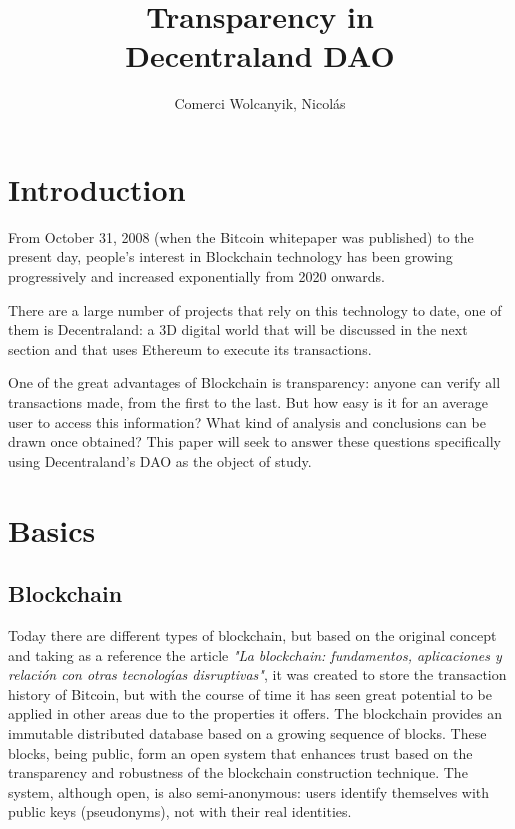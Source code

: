 \documentclass[MSE,Master,english]{twbook}%
\title{Transparency in\\Decentraland DAO}
\author{Comerci Wolcanyik, Nicol{\'a}s}
\begin{document}
\maketitle

%
%
\chapter{Introduction}
From October 31, 2008 (when the Bitcoin whitepaper was published) to the present day, people's interest in Blockchain technology has been growing progressively and increased exponentially from 2020 onwards. 

There are a large number of projects that rely on this technology to date, one of them is Decentraland: a 3D digital world that will be discussed in the next section and that uses Ethereum to execute its transactions.

One of the great advantages of Blockchain is transparency: anyone can verify all transactions made, from the first to the last. But how easy is it for an average user to access this information? What kind of analysis and conclusions can be drawn once obtained? This paper will seek to answer these questions specifically using Decentraland's DAO as the object of study. \\
\toComplete
\clearpage

\chapter{Basics}
\section{Blockchain}
Today there are different types of blockchain, but based on the original concept and taking as a reference the article \emph{"La blockchain: fundamentos, aplicaciones y relaci{\'o}n con otras tecnolog{\'\i}as disruptivas"}\cite{blockchain}, it was created to store the transaction history of Bitcoin, but with the course of time it has seen great potential to be applied in other areas due to the properties it offers. The blockchain provides an immutable distributed database based on a growing sequence of blocks. These blocks, being public, form an open system that enhances trust based on the transparency and robustness of the blockchain construction technique. The system, although open, is also semi-anonymous: users identify themselves with public keys (pseudonyms), not with their real identities.
\end{document}
